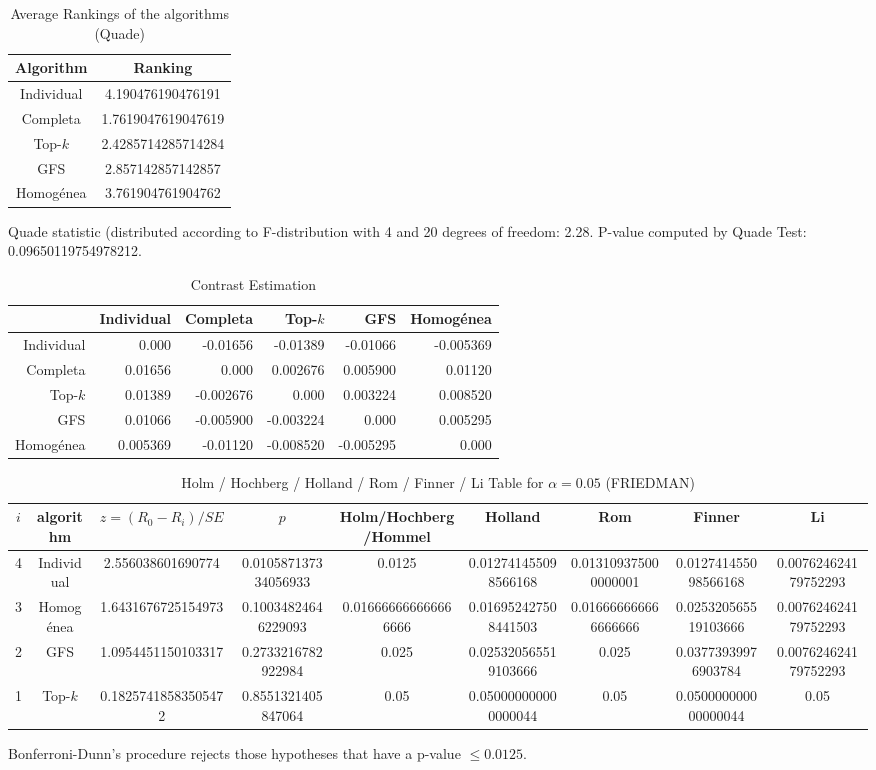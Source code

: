 \documentclass[a4paper,10pt]{article}
\begin{document}
\begin{landscape}
\newpage

\begin{table}[!htp]
\centering
\caption{Average Rankings of the algorithms (Quade)
}\begin{tabular}{c|c}
Algorithm&Ranking\\
\hline
Individual&4.190476190476191\\
Completa&1.7619047619047619\\
Top-$k$&2.4285714285714284\\
GFS&2.857142857142857\\
Homogénea&3.761904761904762\\
\end{tabular}
\end{table}
Quade statistic (distributed according to F-distribution with 4 and 20 degrees of freedom: 2.28. 
P-value computed by Quade Test: 0.09650119754978212.\newline


\newpage

\begin{table}[!htp]
\centering\tiny
\caption{Contrast Estimation}
\begin{tabular}{
|r|r|r|r|r|r|}
\hline
 &Individual&Completa&Top-$k$&GFS&Homogénea\\
\hline
Individual&0.000&-0.01656&-0.01389&-0.01066&-0.005369\\
\hline
Completa&0.01656&0.000&0.002676&0.005900&0.01120\\
\hline
Top-$k$&0.01389&-0.002676&0.000&0.003224&0.008520\\
\hline
GFS&0.01066&-0.005900&-0.003224&0.000&0.005295\\
\hline
Homogénea&0.005369&-0.01120&-0.008520&-0.005295&0.000\\
\hline

\end{tabular}
\end{table}

\newpage

\begin{table}[!htp]
\centering\scriptsize
\caption{Holm / Hochberg / Holland / Rom / Finner / Li Table for $\alpha=0.05$ (FRIEDMAN)}
\begin{tabular}{ccccccccc}
$i$&algorithm&$z=(R_0 - R_i)/SE$&$p$&Holm/Hochberg/Hommel&Holland&Rom&Finner&Li\\
\hline
4&Individual&2.556038601690774&0.010587137334056933&0.0125&0.012741455098566168&0.013109375000000001&0.012741455098566168&0.007624624179752293\\
3&Homogénea&1.6431676725154973&0.10034824646229093&0.016666666666666666&0.016952427508441503&0.016666666666666666&0.025320565519103666&0.007624624179752293\\
2&GFS&1.0954451150103317&0.2733216782922984&0.025&0.025320565519103666&0.025&0.03773939976903784&0.007624624179752293\\
1&Top-$k$&0.18257418583505472&0.8551321405847064&0.05&0.050000000000000044&0.05&0.050000000000000044&0.05\\
\hline
\end{tabular}
\end{table}
Bonferroni-Dunn's procedure rejects those hypotheses that have a p-value $\le0.0125$.



\end{landscape}
\end{document}
